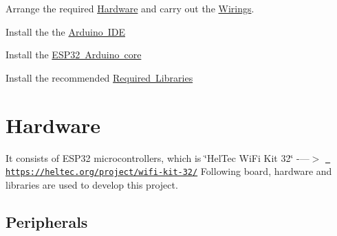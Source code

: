 \begin{DoxyEnumerate}
\item Arrange the required \mbox{\hyperlink{index_hw_sec}{Hardware}} and carry out the \mbox{\hyperlink{index_wiring}{Wirings}}.
\item Install the the \mbox{\hyperlink{index_arduinoide}{Arduino I\+DE}}
\item Install the \mbox{\hyperlink{index_boardlib}{E\+S\+P32 Arduino core}}
\item Install the recommended \mbox{\hyperlink{index_lib}{Required Libraries}}
\end{DoxyEnumerate}\hypertarget{index_hw_sec}{}\section{Hardware}\label{index_hw_sec}
It consists of E\+S\+P32 microcontrollers, which is \char`\"{}\+Hel\+Tec Wi\+Fi Kit 32\char`\"{} -\/---$>$ \href{https://heltec.org/project/wifi-kit-32/}{\texttt{ https\+://heltec.\+org/project/wifi-\/kit-\/32/}} Following board, hardware and libraries are used to develop this project.\hypertarget{index_peri}{}\subsection{Peripherals}\label{index_peri}

